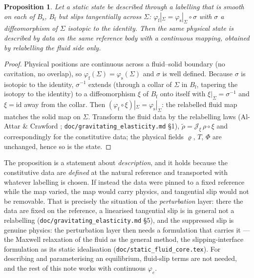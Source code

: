 \documentclass[11pt]{article}
\newtheorem{proposition}{Proposition}
\newcommand{\Jf}{\mathscr{J}}  %
\newcommand{\Bs}{B_{\mathrm{s}}}
\newcommand{\Bf}{B_{\mathrm{f}}}
\begin{document}
\begin{proposition}\label{prop:continuous}
Let a static state be described through a labelling that is smooth on
each of $\Bs$, $\Bf$ but slips tangentially across $\Sigma$:
$\varphi_{\mathrm{f}}|_{\Sigma} = \varphi_{\mathrm{s}}|_{\Sigma}\circ\sigma$
with $\sigma$ a diffeomorphism of $\Sigma$ isotopic to the identity.
Then the same physical state is described by data on the same reference
body with a continuous mapping, obtained by relabelling the fluid side
only.
\end{proposition}
\begin{proof}
Physical positions are continuous across a fluid--solid boundary (no
cavitation, no overlap), so $\varphi_{\mathrm{f}}(\Sigma) =
\varphi_{\mathrm{s}}(\Sigma)$ and $\sigma$ is well defined. Because
$\sigma$ is isotopic to the identity, $\sigma^{-1}$ extends (through a
collar of $\Sigma$ in $\Bf$, tapering the isotopy to the identity) to a
diffeomorphism $\xi$ of $\Bf$ onto itself with $\xi|_\Sigma =
\sigma^{-1}$ and $\xi = \mathrm{id}$ away from the collar. Then
$(\varphi_{\mathrm{f}}\circ\xi)|_\Sigma = \varphi_{\mathrm{s}}|_\Sigma$:
the relabelled fluid map matches the solid map on $\Sigma$. Transform the
fluid data by the relabelling laws (Al-Attar \& Crawford \cite{AC16};
\texttt{doc/gravitating\_elasticity.md} \S1), $\tilde\rho = \Jf _\xi\,\rho\circ\xi$
and correspondingly for the constitutive data; the physical fields
$\varrho$, $T$, $\Phi$ are unchanged, hence so is the state.
\end{proof}

The proposition is a statement about \emph{description}, and it holds
because the constitutive data are \emph{defined} at the natural
reference and transported with whatever labelling is chosen. If instead
the data were pinned to a fixed reference while the map varied, the map
would carry physics, and tangential slip would not be removable. That is
precisely the situation of the \emph{perturbation} layer: there the data
are fixed on the reference, a linearised tangential slip is in general
not a relabelling (\texttt{doc/gravitating\_elasticity.md} \S5), and the
suppressed slip is genuine physics: the perturbation layer then needs a
formulation that carries it --- the Maxwell relaxation of the fluid as
the general method, the slipping-interface formulation as its static
idealisation (\texttt{doc/static\_fluid\_core.tex}). For describing and
parameterising an equilibrium, fluid-slip terms are not needed, and the
rest of this note works with continuous $\varphi_e$.
\end{document}
